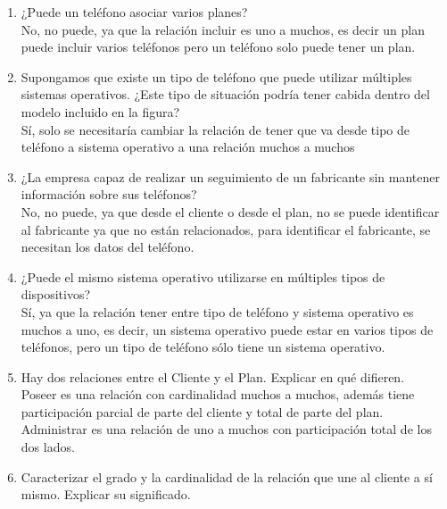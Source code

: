 \documentclass[a4paper, 12pt]{report}
\begin{document}
\begin{enumerate}
{\begin{enumerate}
{\begin{enumerate}
            Sí, ya que la participación de un teléfono a incluir no es
            total, por lo que el teléfono no necesita tener un plan.
            \item ¿Puede un teléfono asociar varios planes?\\
            No, no puede, ya que la relación incluir es uno a muchos,
            es decir un plan puede incluir varios teléfonos pero un
            teléfono solo puede tener un plan.
            \item Supongamos que existe un tipo de teléfono que puede
            utilizar múltiples sistemas operativos. ¿Este tipo de
            situación podría tener cabida dentro del modelo incluido
            en la figura?\\
            Sí, solo se necesitaría cambiar la relación de tener que va
            desde tipo de teléfono a sistema operativo a una relación
            muchos a muchos
            \item ¿La empresa capaz de realizar un seguimiento de un
            fabricante sin mantener información sobre sus teléfonos?\\
            No, no puede, ya que desde el cliente o desde el plan,
            no se puede identificar al fabricante ya que no están
            relacionados, para identificar el fabricante, se necesitan
            los datos del teléfono.
            \item ¿Puede el mismo sistema operativo utilizarse en
            múltiples tipos de dispositivos?\\
            Sí, ya que la relación tener entre tipo de teléfono y
            sistema operativo es muchos a uno, es decir, un sistema
            operativo puede estar en varios tipos de teléfonos, pero
            un tipo de teléfono sólo tiene un sistema operativo.
            \item Hay dos relaciones entre el Cliente y el Plan. Explicar en qué
                difieren.\\
            Poseer es una relación con cardinalidad muchos a muchos,
            además tiene participación parcial de parte del cliente y
            total de parte del plan.\\
            Administrar es una relación de uno a muchos con
            participación total de los dos lados.
            \item Caracterizar el grado y la cardinalidad de la
            relación que une al cliente a sí mismo. Explicar su
            significado.\\

\end{enumerate}}
\end{enumerate}}
\end{enumerate}
\end{document}
